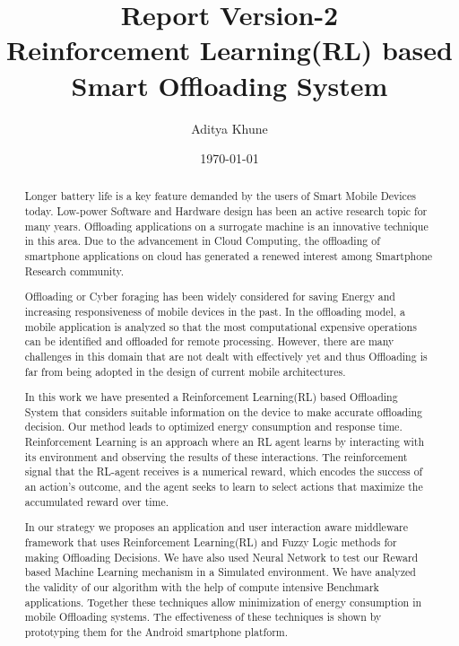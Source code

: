 \documentclass[12pt]{report}
\begin{document}
\title{Report Version-2\\
Reinforcement Learning(RL) based\\
Smart Offloading System}

\author{Aditya Khune}

\date{\today}  %
\maketitle
\tableofcontents



\begin{abstract}
Longer battery life is a key feature demanded by the users of Smart Mobile Devices today. Low-power Software and Hardware design has been an active research topic for many years. Offloading applications on a surrogate machine is an innovative technique in this area. Due to the advancement in Cloud Computing, the offloading of smartphone applications on cloud has generated a renewed interest among Smartphone Research community.

Offloading or Cyber foraging has been widely considered for saving Energy and increasing responsiveness of mobile devices in the past.
In the offloading model, a mobile application is analyzed so that the most computational expensive operations can be identified and offloaded for remote processing. However, there are many challenges in this domain that are not dealt with effectively yet and thus Offloading is far from being adopted in the design of current mobile architectures.

In this work we have presented a Reinforcement Learning(RL) based Offloading System that considers suitable information on the device to make accurate offloading decision. Our method leads to optimized energy consumption and response time. Reinforcement Learning is an approach where an RL agent learns by interacting with its environment and observing the results of these interactions. The reinforcement signal that the RL-agent receives is a numerical reward, which encodes the success of an action’s outcome, and the agent seeks to learn to select actions that maximize the accumulated reward over time.

In our strategy we proposes an application and user interaction aware middleware framework that uses Reinforcement Learning(RL) and Fuzzy Logic methods for making Offloading Decisions. We have also used Neural Network to test our Reward based Machine Learning mechanism in a Simulated environment. We have analyzed the validity of our algorithm with the help of compute intensive Benchmark applications. Together these techniques allow minimization of energy consumption in mobile Offloading systems. The effectiveness of these techniques is shown by prototyping them for the Android smartphone platform.
\end{abstract}
\end{document}
